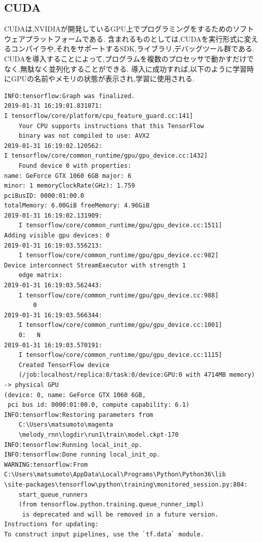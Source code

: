 \subsection{CUDA}
CUDAは,NVIDIAが開発しているGPU上でプログラミングをするためのソフトウェアプラットフォームである.
含まれるものとしては,CUDAを実行形式に変えるコンパイラや,それをサポートするSDK,ライブラリ,デバッグツール群である.
CUDAを導入することによって,プログラムを複数のプロセッサで動かすだけでなく,無駄なく並列化することができる.
導入に成功すれば,以下のように学習時にGPUの名前やメモリの状態が表示され,学習に使用される.
\begin{lstlisting}[basicstyle=\ttfamily\footnotesize,frame=single]
INFO:tensorflow:Graph was finalized.
2019-01-31 16:19:01.831071: 
I tensorflow/core/platform/cpu_feature_guard.cc:141]
    Your CPU supports instructions that this TensorFlow
    binary was not compiled to use: AVX2
2019-01-31 16:19:02.120562: 
I tensorflow/core/common_runtime/gpu/gpu_device.cc:1432]
    Found device 0 with properties:
name: GeForce GTX 1060 6GB major: 6 
minor: 1 memoryClockRate(GHz): 1.759
pciBusID: 0000:01:00.0
totalMemory: 6.00GiB freeMemory: 4.96GiB
2019-01-31 16:19:02.131909:
    I tensorflow/core/common_runtime/gpu/gpu_device.cc:1511] 
Adding visible gpu devices: 0
2019-01-31 16:19:03.556213:
    I tensorflow/core/common_runtime/gpu/gpu_device.cc:982]
Device interconnect StreamExecutor with strength 1
    edge matrix:
2019-01-31 16:19:03.562443:
    I tensorflow/core/common_runtime/gpu/gpu_device.cc:988]
        0
2019-01-31 16:19:03.566344:
    I tensorflow/core/common_runtime/gpu/gpu_device.cc:1001]
    0:   N
2019-01-31 16:19:03.570191:
    I tensorflow/core/common_runtime/gpu/gpu_device.cc:1115]
    Created TensorFlow device
    (/job:localhost/replica:0/task:0/device:GPU:0 with 4714MB memory)
-> physical GPU 
(device: 0, name: GeForce GTX 1060 6GB,
 pci bus id: 0000:01:00.0, compute capability: 6.1)
INFO:tensorflow:Restoring parameters from
    C:\Users\matsumoto\magenta
    \melody_rnn\logdir\run1\train\model.ckpt-170
INFO:tensorflow:Running local_init_op.
INFO:tensorflow:Done running local_init_op.
WARNING:tensorflow:From 
C:\Users\matsumoto\AppData\Local\Programs\Python\Python36\lib
\site-packages\tensorflow\python\training\monitored_session.py:804:
    start_queue_runners 
    (from tensorflow.python.training.queue_runner_impl)
     is deprecated and will be removed in a future version.
Instructions for updating:
To construct input pipelines, use the `tf.data` module.
\end{lstlisting}
